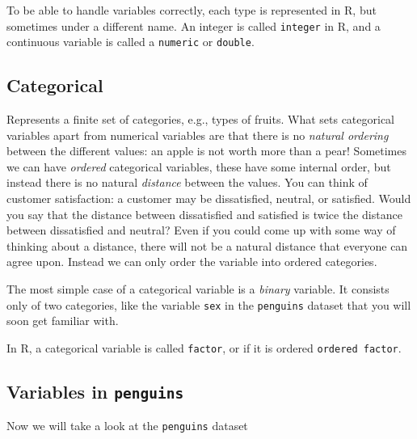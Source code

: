 \documentclass[
  letterpaper,
  DIV=11,
  numbers=noendperiod]{scrreprt}
\begin{document}
To be able to handle variables correctly, each type is represented in R,
but sometimes under a different name. An integer is called
\texttt{integer} in R, and a continuous variable is called a
\texttt{numeric} or \texttt{double}.

\subsection{Categorical}\label{sec-basicstat-categorical}

Represents a finite set of categories, e.g., types of fruits. What sets
categorical variables apart from numerical variables are that there is
no \emph{natural ordering} between the different values: an apple is not
worth more than a pear! Sometimes we can have \emph{ordered} categorical
variables, these have some internal order, but instead there is no
natural \emph{distance} between the values. You can think of customer
satisfaction: a customer may be dissatisfied, neutral, or satisfied.
Would you say that the distance between dissatisfied and satisfied is
twice the distance between dissatisfied and neutral? Even if you could
come up with some way of thinking about a distance, there will not be a
natural distance that everyone can agree upon. Instead we can only order
the variable into ordered categories.

The most simple case of a categorical variable is a \emph{binary}
variable. It consists only of two categories, like the variable
\texttt{sex} in the \texttt{penguins} dataset that you will soon get
familiar with.

In R, a categorical variable is called \texttt{factor}, or if it is
ordered \texttt{ordered\ factor}.

\subsection{\texorpdfstring{Variables in
\texttt{penguins}}{Variables in penguins}}\label{variables-in-penguins}

Now we will take a look at the \texttt{penguins} dataset
\end{document}
